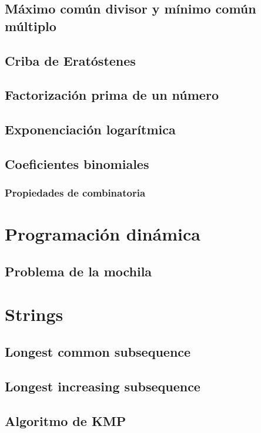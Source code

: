 \documentclass[10pt,letterpaper,twocolumn]{article}
\begin{document}
	\subsection{Máximo común divisor y mínimo común múltiplo}
	
	\subsection{Criba de Eratóstenes}
	
	\subsection{Factorización prima de un número}
	
	\subsection{Exponenciación logarítmica}
	
	\subsection{Coeficientes binomiales}
		
		\subsubsection{Propiedades de combinatoria}
	
\section{Programación dinámica}
	\subsection{Problema de la mochila}
	
	
\section{Strings}
	\subsection{Longest common subsequence}
	
	\subsection{Longest increasing subsequence}
	
	\subsection{Algoritmo de KMP}
	
\end{document}
